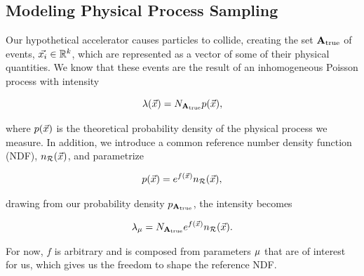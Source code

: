 \documentclass[../../ddppaper2.tex]{subfiles}
\begin{document}
\subsection{Modeling Physical Process Sampling}
Our hypothetical accelerator causes particles to collide, creating the set ${{\mathbf{A}}}_{\text{true}}$ of events, ${\vec{{x}_i}} \in \mathbb{R}^k$, which are represented as a vector of some of their physical quantities. We know that these events are the result of an inhomogeneous Poisson process with intensity

\begin{equation}   
    \lambda(\vec{{x}})={N_{{{\mathbf{A}}}_{\text{true}}}} p(\vec{{x}}),
\end{equation}

\noindent where $p(\vec{{x}})$ is the theoretical probability density of the physical process we measure. In addition, we introduce a common reference number density function (NDF), $n_{\mathcal{R}}({\vec{{x}}})$, and parametrize

\begin{equation}
    p(\vec{{x}}) = e^{f(\vec{{x}})} n_{\mathcal{R}}({\vec{{x}}}),
\end{equation}

\noindent drawing from our probability density $p_{{{\mathbf{A}}}_{\text{true}}}$, the intensity becomes

\begin{eqnarray}
\label{eq:learnable_distribution}
    \lambda_\param = N_{\true{A}} e^{f(\anyevent)} \refdist.
\end{eqnarray}

\noindent For now, $f$ is arbitrary and is composed from parameters ${\mu}$ that are of interest for us, which gives us the freedom to shape the reference NDF.
\end{document}
